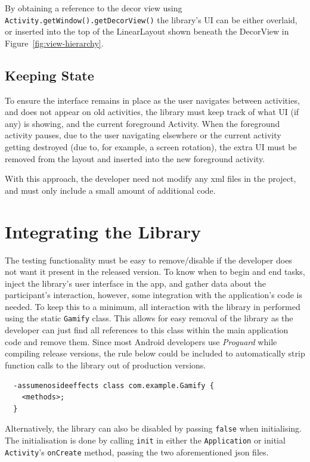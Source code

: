 By obtaining a reference to the decor view using 
\verb/Activity.getWindow().getDecorView()/ the library's UI can
be either overlaid, or inserted into the top of the LinearLayout
shown beneath the DecorView in Figure~\ref{fig:view-hierarchy}.

\subsection{Keeping State}

To ensure the interface remains in place as the user navigates
between activities, and does not appear on old activities, the
library must keep track of what UI (if any) is showing, and 
the current foreground Activity. When the foreground activity
pauses, due to the user navigating elsewhere or the current
activity getting destroyed (due to, for example, a screen
rotation), the extra UI must be removed from the layout and 
inserted into the new foreground activity.

With this approach, the developer need not modify any xml files
in the project, and must only include a small amount of additional
code.

\section{Integrating the Library}

The testing functionality must be easy to remove/disable if the
developer does not want it present in the released version. To know
when to begin and end tasks, inject the library's user interface
in the app, and gather data about the participant's interaction,
however, some integration with the application's code is needed.
To keep this to a minimum, all interaction with the library in
performed using the static \verb/Gamify/ class. This allows for
easy removal of the library as the developer can just find all
references to this class within the main application code and remove
them. Since most Android developers use \emph{Proguard} while
compiling release versions, the rule below could be included to
automatically strip function calls to the library out of production
versions.

\begin{verbatim}
  -assumenosideeffects class com.example.Gamify {
    <methods>;
  }
\end{verbatim}

Alternatively, the library can also be disabled by passing \verb|false|
when initialising. The initialisation is done by calling \verb|init|
in either the \verb|Application| or initial \verb|Activity|'s
\verb|onCreate| method, passing the two aforementioned json files.

